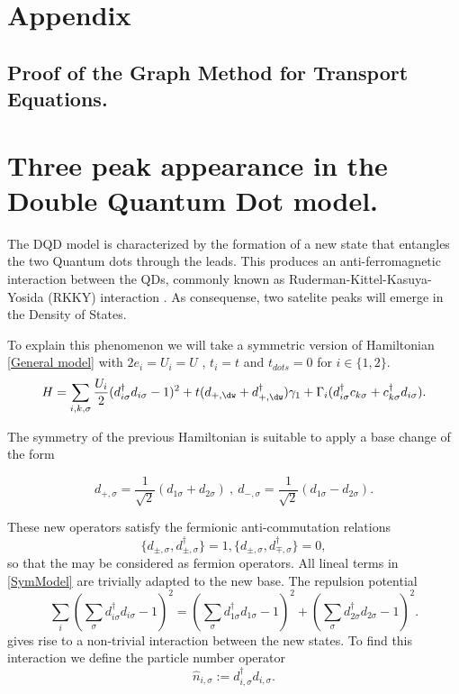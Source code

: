 \chapter{Appendix}



\section{Proof of the Graph Method for Transport Equations.\label{sec:AbsGraphmethod}}


\chapter{Three peak appearance in the Double Quantum Dot model.\label{sec:DoublePeak}}

The DQD model is characterized by the formation of 
a new state that entangles the two Quantum dots through the leads. This produces an anti-ferromagnetic interaction between the QDs, commonly known
as Ruderman-Kittel-Kasuya-Yosida (RKKY) interaction \citep{ruderman_indirect_1954,yosida_magnetic_1957}. As consequense, two satelite peaks will emerge in the Density of States.  




To explain this phenomenon we will take a symmetric version of Hamiltonian \eqref{General model} with $2e_i =U_i =U $ , $t_i = t$ and $t_{dots} = 0$ for $i \in \{ 1,2 \}$. 
\begin{equation}
H =\sum_{i,k,\sigma}  \frac{U_i}{2}(d_{i \sigma}^{\dagger}d_{i \sigma}-1)^{2} + t(d_{+,\dw}+d^\dagger_{+,\dw})\gamma_1 + \Gamma_i(d^\dagger_{i\sigma}c_{k\sigma}+c^\dagger_{k\sigma}d_{i\sigma}).
\label{SymModel}
\end{equation}

The symmetry of the previous Hamiltonian is suitable to apply a base change of the form 
 
\[
  d_{+ , \sigma} = \frac{1}{\sqrt{2}} (d_{1\sigma} +d_{2\sigma}) \ , \ 
  d_{- , \sigma} = \frac{1}{\sqrt{2}} (d_{1\sigma} -d_{2\sigma}).
\]


These new operators satisfy the fermionic anti-commutation relations 
 \[ \{d_{\pm , \sigma}, d^\dagger_{\pm , \sigma}\} = 1 , \{ d_{\pm , \sigma}, d^\dagger_{\mp , \sigma}\} = 0,
\]
 so that the may be considered as fermion operators. All lineal terms in \eqref{SymModel} are trivially adapted to the new base. The repulsion potential 
$$\sum_{i} (\sum_{\sigma} d_{i \sigma}^{\dagger}d_{i \sigma}-1)^{2} = (\sum_{\sigma} d_{1 \sigma}^{\dagger}d_{1 \sigma}-1)^{2} + (\sum_{\sigma} d_{2 \sigma}^{\dagger}d_{2 \sigma}-1)^{2} . $$ 
gives rise to a non-trivial interaction between the new states. To find this interaction we define the particle number operator  
\[\hat{n}_{i,\sigma}:= d^\dagger_{i,\sigma}d_{i,\sigma}.\] 

